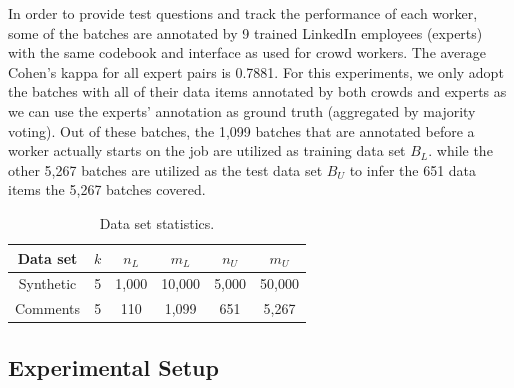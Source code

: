 In order to provide test questions and track the performance of each worker, 
some of the batches are annotated by 9 trained LinkedIn employees (experts) with the same codebook and interface as used for crowd workers.  
The average Cohen's kappa for all expert pairs is 0.7881.  
For this experiments, we only adopt the batches with all of their data items annotated by both crowds and experts 
as we can use the experts' annotation as ground truth (aggregated by majority voting).  
Out of these batches, the 1,099 batches that are 
annotated before a worker actually starts on the job 
are utilized as training data set $B_L$.  
while the other 5,267 batches are utilized as the test data set $B_U$ to infer the 651 data items the 5,267 batches covered.  


\begin{table}[!t]
\centering
 {\caption{Data set statistics.}\label{tab:dataset}}
{
  \begin{tabular}{c||c|c|c|c|c}
  \hline
  Data set & $k$ & $n_L$  &  $m_L$ & $n_U$  & $m_U$ \\ \hline \hline
 Synthetic & 5 & 1,000 & 10,000 & 5,000 & 50,000 \\ \hline 
 Comments  & 5 & 110   & 1,099  & 651   & 5,267  \\ \hline  
  \end{tabular}
}
\end{table}


\subsection{Experimental Setup}

